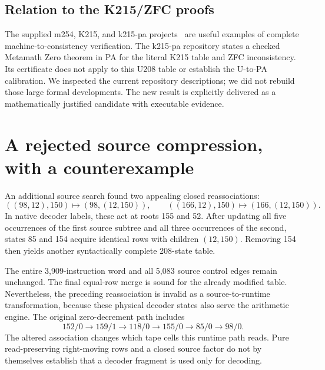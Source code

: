 \documentclass[11pt,letterpaper]{article}
\begin{document}
\subsection{Relation to the K215/ZFC proofs}
The supplied m254, K215, and k215-pa projects~\cite{m254,k215,k215pa}
are useful examples of complete machine-to-consistency verification.
The k215-pa repository states a checked Metamath Zero theorem in PA for the
literal K215 table and ZFC inconsistency. Its certificate does not apply to
this U208 table or establish the U-to-PA calibration. We inspected the
current repository descriptions; we did not rebuild those large formal
developments. The new result is explicitly delivered as a mathematically
justified candidate with executable evidence.

\section{A rejected source compression, with a counterexample}
An additional source search found two appealing closed reassociations:
\[
 ((98,12),150)\longmapsto(98,(12,150)),\qquad
 ((166,12),150)\longmapsto(166,(12,150)).
\]
In native decoder labels, these act at roots 155 and 52. After updating all
five occurrences of the first source subtree and all three occurrences of
the second, states 85 and 154 acquire identical rows with children
$(12,150)$. Removing 154 then yields another syntactically complete
208-state table.

The entire 3,909-instruction word and all 5,083 source control edges remain
unchanged. The final equal-row merge is sound for the already modified
table. Nevertheless, the preceding reassociation is invalid as a
source-to-runtime transformation, because these physical decoder states
also serve the arithmetic engine. The original zero-decrement path includes
\[
 152/0\longrightarrow159/1\longrightarrow118/0
 \longrightarrow155/0\longrightarrow85/0\longrightarrow98/0.
\]
The altered association changes which tape cells this runtime path reads.
Pure read-preserving right-moving rows and a closed source factor do not
by themselves establish that a decoder fragment is used only for decoding.
\end{document}

